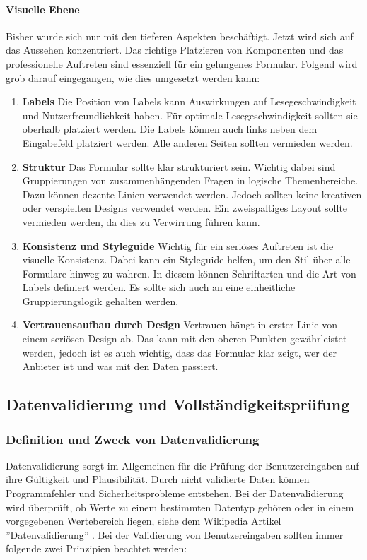 \paragraph{Visuelle Ebene}
Bisher wurde sich nur mit den tieferen Aspekten beschäftigt. Jetzt wird sich auf das Aussehen konzentriert. Das richtige Platzieren von Komponenten und das professionelle Auftreten sind essenziell für ein gelungenes Formular. Folgend wird grob darauf eingegangen, wie dies umgesetzt werden kann:
\begin{enumerate}
    \item \textbf{Labels}
    Die Position von Labels kann Auswirkungen auf Lesegeschwindigkeit und Nutzerfreundlichkeit haben. Für optimale Lesegeschwindigkeit sollten sie oberhalb platziert werden. Die Labels können auch links neben dem Eingabefeld platziert werden. Alle anderen Seiten sollten vermieden werden.
    
    \item \textbf{Struktur}
    Das Formular sollte klar strukturiert sein. Wichtig dabei sind Gruppierungen von zusammenhängenden Fragen in logische Themenbereiche. Dazu können dezente Linien verwendet werden. Jedoch sollten keine kreativen oder verspielten Designs verwendet werden. Ein zweispaltiges Layout sollte vermieden werden, da dies zu Verwirrung führen kann.
    
    \item \textbf{Konsistenz und Styleguide}
    Wichtig für ein seriöses Auftreten ist die visuelle Konsistenz. Dabei kann ein Styleguide helfen, um den Stil über alle Formulare hinweg zu wahren. In diesem können Schriftarten und die Art von Labels definiert werden. Es sollte sich auch an eine einheitliche Gruppierungslogik gehalten werden.
    
    \item \textbf{Vertrauensaufbau durch Design}
    Vertrauen hängt in erster Linie von einem seriösen Design ab. Das kann mit den oberen Punkten gewährleistet werden, jedoch ist es auch wichtig, dass das Formular klar zeigt, wer der Anbieter ist und was mit den Daten passiert.
\end{enumerate}

\subsection{Datenvalidierung und Vollständigkeitsprüfung \label{datenvaliderung}}
\subsubsection{Definition und Zweck von Datenvalidierung}
Datenvalidierung sorgt im Allgemeinen für die Prüfung der Benutzereingaben auf ihre Gültigkeit und Plausibilität. Durch nicht validierte Daten können Programmfehler und Sicherheitsprobleme entstehen. Bei der Datenvalidierung wird überprüft, ob Werte zu einem bestimmten Datentyp gehören oder in einem vorgegebenen Wertebereich liegen, siehe dem Wikipedia Artikel ''Datenvalidierung'' \cite{wikiDatavalidation}. Bei der Validierung von Benutzereingaben sollten immer folgende zwei Prinzipien beachtet werden:

